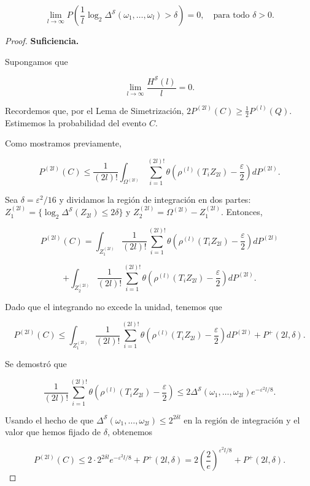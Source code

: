 \documentclass{report}
\begin{document}
\begin{equation}
    \lim_{l \to \infty} P\left( \frac{1}{l}\log_2 \Delta^{\mathcal{S}}(\omega_1, \dots, \omega_l) > \delta  \right) = 0, 
    \quad \text{para todo } \delta > 0.
\end{equation}
\begin{proof}


\textbf{Suficiencia.} 

Supongamos que

\[
\lim_{l \to \infty} \frac{H^{\mathcal{S}}(l)}{l} = 0.
\]

Recordemos que, por el Lema de Simetrización, \( 2P^{(2l)}(C) \geq \frac{1}{2} P^{(l)}(Q) \). Estimemos la probabilidad del evento \( C \).\newline

Como mostramos previamente,

\[
P^{(2l)}(C) \leq \frac{1}{(2l)!} \int_{\Omega^{(2l)}} \sum_{i=1}^{(2l)!} \theta \left( \rho^{(l)}(T_i Z_{2l}) - \frac{\varepsilon}{2} \right) dP^{(2l)}.
\]

Sea \( \delta = \varepsilon^2 / 16 \) y dividamos la región de integración en dos partes: 
\( Z_1^{(2l)} = \{ \log_2 \Delta^{\mathcal{S}}(Z_{2l}) \leq 2\delta \} \) y 
\( Z_2^{(2l)} = \Omega^{(2l)} - Z_1^{(2l)} \). Entonces,

\[
P^{(2l)}(C) = \int_{Z_1^{(2l)}} \frac{1}{(2l)!} \sum_{i=1}^{(2l)!} \theta \left( \rho^{(l)}(T_i Z_{2l}) - \frac{\varepsilon}{2} \right) dP^{(2l)}
\]

\[
+ \int_{Z_2^{(2l)}} \frac{1}{(2l)!} \sum_{i=1}^{(2l)!} \theta \left( \rho^{(l)}(T_i Z_{2l}) - \frac{\varepsilon}{2} \right) dP^{(2l)}.
\]

Dado que el integrando no excede la unidad, tenemos que

\[
P^{(2l)}(C) \leq \int_{Z_1^{(2l)}} \frac{1}{(2l)!} \sum_{i=1}^{(2l)!} \theta \left( \rho^{(l)}(T_i Z_{2l}) - \frac{\varepsilon}{2} \right) dP^{(2l)} + P^+(2l, \delta).
\]

Se demostró que

\[
\frac{1}{(2l)!} \sum_{i=1}^{(2l)!} \theta \left( \rho^{(l)}(T_i Z_{2l}) - \frac{\varepsilon}{2} \right) \leq 2 \Delta^{\mathcal{S}}(\omega_1, \dots, \omega_{2l}) e^{-\varepsilon^2 l / 8}.
\]

Usando el hecho de que \( \Delta^{\mathcal{S}}(\omega_1, \dots, \omega_{2l}) \leq 2^{2\delta l} \) en la región de integración y el valor que hemos
fijado de $\delta$, obtenemos

\[
P^{(2l)}(C) \leq 2 \cdot 2^{2\delta l} e^{-\varepsilon^2 l / 8} + P^+(2l, \delta) = 2\left(\frac{2}{e}\right)^{\varepsilon^2 l / 8} + P^+(2l, \delta).
\]


\end{proof}
\end{document}
